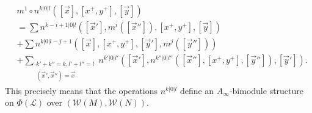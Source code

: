 \documentclass{amsart}
\numberwithin{equation}{section}
\numberwithin{figure}{section}
\begin{document}
\begin{equation} \label{bimodule equation}
\begin{split}
&m^{1} \circ n^{k|0|l}([\vec{x}], [x^{+}, y^{+}], [\vec{y}])\\
&= \sum n^{k-i+1|0|l}([\vec{x}'], m^{i}([\vec{x}'']), [x^{+}, y^{+}], [\vec{y}])\\
&+ \sum n^{k|0|l-j+1}([\vec{x}], [x^{+}, y^{+}], [\vec{y}'], m^{j}([\vec{y}'']))\\
&+ \sum_{\substack{k'+k''=k, l'+l''=l\\ (\vec{x}', \vec{x}'') = \vec{x}}} n^{k'|0|l'}([\vec{x}'], n^{k''|0|l''}([\vec{x}''], [x^{+}, y^{+}], [\vec{y}'']), [\vec{y}']).
\end{split}
\end{equation}
This precisely means that the operations $n^{k|0|l}$ define an $A_{\infty}$-bimodule structure on $\Phi(\mathcal{L})$ over $(\mathcal{W}(M), \mathcal{W}(N))$. \par
\end{document}
